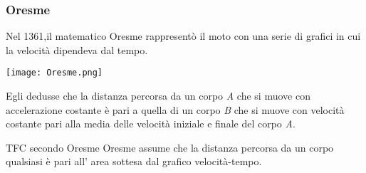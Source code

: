 \begin{frame}[label=Oresme]
  \frametitle{Oresme}
    Nel 1361,il matematico Oresme rappresentò il moto con una serie
    di grafici in cui \alert{la velocità} dipendeva dal \alert{tempo}.
    \begin{center}
    \texttt{[image: Oresme.png]}    
    \end{center}
    \pause
    Egli dedusse che la distanza percorsa da un corpo \textit{A} che si muove con 
    accelerazione costante è pari a quella di un corpo \textit{B} che si muove con 
    velocità costante pari alla media delle velocità iniziale e finale del corpo \textit{A}.
    \pause
    \begin{block}{TFC secondo Oresme}
      Oresme assume che la distanza percorsa da un corpo qualsiasi è pari
      all' \alert{area} sottesa dal grafico velocità-tempo.
    \end{block}  
  
  \end{frame}